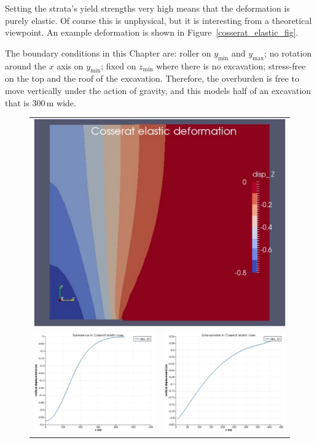 \documentclass[]{scrreprt}
\begin{document}
Setting the strata's yield strengths very high means that the
deformation is purely elastic.  Of course this is unphysical, but it
is interesting from a theoretical viewpoint.  An example deformation
is shown in Figure~\ref{cosserat_elastic_fig}.

The boundary conditions in this Chapter are: roller on
$y_{\mathrm{min}}$ and $y_{\mathrm{max}}$; no rotation around the $x$
axis on $y_{\mathrm{min}}$; fixed on $z_{\mathrm{min}}$
where there is no excavation; stress-free on the top and the roof of
the excavation.  Therefore, the overburden is free to move vertically
under the action of gravity, and this models half of an excavation
that is 300\,m wide.

\begin{figure}[htbp]
  \begin{center}
    \begin{tabular}{cc}
\multicolumn{2}{c}{\includegraphics[width=12cm]{cosserat_elastic_figure_1.pdf}} \\
      \includegraphics[width=6cm]{cosserat_elastic_figure_2.pdf} &
      \includegraphics[width=6cm]{cosserat_elastic_figure_3.pdf} \\

\end{tabular}
\end{center}
\end{figure}
\end{document}
